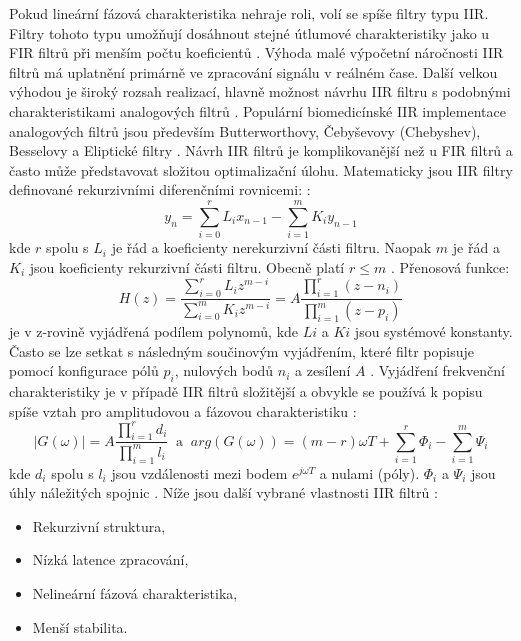 Pokud lineární fázová charakteristika nehraje roli, volí se spíše filtry typu
IIR. Filtry tohoto typu umožňují dosáhnout stejné útlumové charakteristiky jako
u FIR filtrů při menším počtu koeficientů \cite{Prchal2000}. Výhoda malé
výpočetní náročnosti IIR filtrů má uplatnění primárně ve zpracování signálu v
reálném čase. Další velkou výhodou je široký rozsah realizací, hlavně možnost
návrhu IIR filtru s podobnými charakteristikami analogových filtrů
\cite{Jan2002,Lyons1997}. Populární biomedicínské IIR implementace analogových
filtrů jsou především Butterworthovy, Čebyševovy (Chebyshev), Besselovy a
Eliptické filtry \cite{Paarmann2006}. Návrh IIR filtrů je komplikovanější než u
FIR filtrů a často může představovat složitou optimalizační úlohu. Matematicky
jsou IIR filtry definované rekurzivními diferenčními rovnicemi: \cite{Jan2002}:
\begin{equation}
	\label{eq:conv_iir}
	y_n = \sum_{i=0}^{r} L_i x_{n-1} - \sum_{i=1}^{m} K_i y_{n-1}
\end{equation}
kde $r$ spolu s $L_i$ je řád a koeficienty nerekurzivní části filtru. Naopak $m$
je řád a $K_i$ jsou koeficienty rekurzivní části filtru. Obecně platí $r \leq m$
\cite{Jan2002,Prchal2000}. Přenosová funkce:
\begin{equation}
	\label{eq:transfer_iir}
	H(z) = \frac{\sum_{i=0}^{r} L_i z^{m-i}}{\sum_{i=0}^{m} K_i z^{m-i}} = A \frac{\prod_{i=1}^{r} (z-n_i)}{\prod_{i=1}^{m} (z-p_i)}
\end{equation}
je v z-rovině vyjádřená podílem polynomů, kde $Li$ a $Ki$ jsou systémové
konstanty. Často se lze setkat s následným součinovým vyjádřením, které filtr
popisuje pomocí konfigurace pólů $p_i$, nulových bodů $n_i$ a zesílení $A$
\cite{Jan2002,Prchal2000}. Vyjádření frekvenční charakteristiky je v případě IIR
filtrů složitější a obvykle se používá k popisu spíše vztah pro amplitudovou a
fázovou charakteristiku \cite{Jan2002}:
\begin{equation}
	\label{eq:ampphase_iir}
	|G(\omega)| = A \frac{\prod_{i=1}^{r} d_i}{\prod_{i=1}^{m} l_i} ~\text{~a~}~ arg(G(\omega)) = (m-r)\omega T + \sum_{i=1}^{r} \Phi_i - \sum_{i=1}^{m} \Psi_i
\end{equation}
kde $d_i$ spolu s $l_i$ jsou vzdálenosti mezi bodem $e^{j\omega T}$ a nulami
(póly). $\Phi_i$ a $\Psi_i$ jsou úhly náležitých spojnic
\cite{Prchal2000,Jan2002}. Níže jsou další vybrané vlastnosti IIR filtrů
\cite{Jan2002}:
\begin{itemize}[noitemsep]
	\item Rekurzivní struktura,
	\item Nízká latence zpracování,
	\item Nelineární fázová charakteristika,
	\item Menší stabilita.
\end{itemize}

